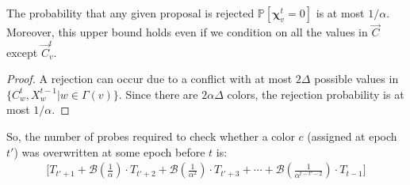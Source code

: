 \begin{lemma}
\label{lem:color_reject_probability}
The probability that any given proposal is rejected $\mathbb P[\bm\chi^t_v=0]$ is at most $1/\alpha$.
Moreover, this upper bound holds even if we condition on all the values in $\vec C$ except $\vec C^t_v$.
\end{lemma}
\begin{proof}
A rejection can occur due to a conflict with at most $2\Delta$ possible values in $\{ C^t_w, X^{t-1}_w | w\in\Gamma(v)\}$.
Since there are $2\alpha\Delta$ colors, the rejection probability is at most $1/\alpha$.
\end{proof}

So, the number of probes required to check whether a color $c$ (assigned at epoch $t'$) was overwritten at some epoch before $t$ is:
\begin{align}
\label{eq:color_overwrite}
\Biggl[T_{t'+1} + \mathcal B\left(\frac{1}{\alpha}\right)\cdot T_{t'+2}
+ \mathcal B\left(\frac{1}{\alpha^2}\right)\cdot T_{t'+3} + \cdots
+ \mathcal B\left(\frac{1}{\alpha^{t-t'-2}}\right)\cdot T_{t-1} \Biggr]
\end{align}

